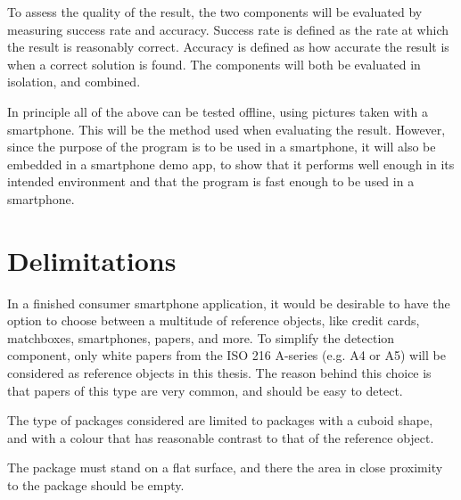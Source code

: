 To assess the quality of the result, the two components will be evaluated by measuring success rate and accuracy.
Success rate is defined as the rate at which the result is reasonably correct.
Accuracy is defined as how accurate the result is when a correct solution is found.
The components will both be evaluated in isolation, and combined.

In principle all of the above can be tested offline, using pictures taken with a smartphone.
This will be the method used when evaluating the result.
However, since the purpose of the program is to be used in a smartphone, it will also be embedded in a smartphone demo app, to show that it performs well enough in its intended environment and that the program is fast enough to be used in a smartphone.

\section{Delimitations}
In a finished consumer smartphone application, it would be desirable to have the option to choose between a multitude of reference objects, like credit cards, matchboxes, smartphones, papers, and more. 
To simplify the detection component, only white papers from the ISO 216 A-series (e.g. A4 or A5) will be considered as reference objects in this thesis.
The reason behind this choice is that papers of this type are very common, and should be easy to detect.

The type of packages considered are limited to packages with a cuboid shape, and with a colour that has reasonable contrast to that of the reference object.

The package must stand on a flat surface, and there the area in close proximity to the package should be empty.


